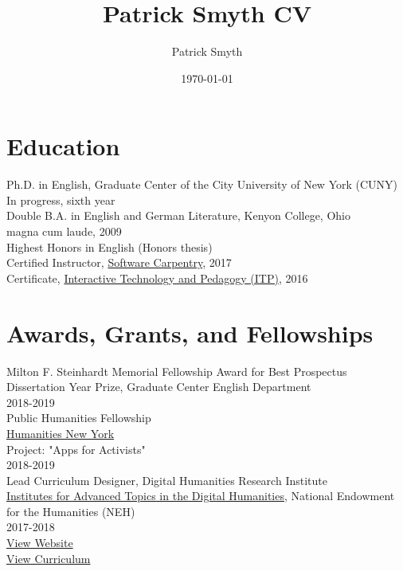 \documentclass[11pt]{article}
\author{Patrick Smyth}
\date{\today}
\title{Patrick Smyth CV}
\begin{document}
\maketitle
\section*{Education}
\label{sec:orgheadline1}
Ph.D. in English, Graduate Center of the City University of New York (CUNY)\\
        In progress, sixth year\\

Double B.A. in English and German Literature, Kenyon College, Ohio\\
        magna cum laude, 2009\\
        Highest Honors in English (Honors thesis)\\

Certified Instructor, \href{https://software-carpentry.org/about/}{Software Carpentry}, 2017\\

Certificate, \href{https://www.gc.cuny.edu/Page-Elements/Academics-Research-Centers-Initiatives/Certificate-Programs/Interactive-Technology-and-Pedagogy}{Interactive Technology and Pedagogy (ITP)}, 2016\\

\section*{Awards, Grants, and Fellowships}
\label{sec:orgheadline2}
Milton F. Steinhardt Memorial Fellowship Award for Best Prospectus\\
Dissertation Year Prize, Graduate Center English Department\\
2018-2019\\

Public Humanities Fellowship\\
\href{https://humanitiesny.org/}{Humanities New York}\\
Project: "Apps for Activists"\\
2018-2019\\

Lead Curriculum Designer, Digital Humanities Research Institute\\
\href{https://www.neh.gov/grants/odh/institutes-advanced-topics-in-the-digital-humanities}{Institutes for Advanced Topics in the Digital Humanities}, National Endowment for the Humanities (NEH)\\
2017-2018\\
\href{http://dhinstitutes.org}{View Website}\\
\href{https://github.com/DHRI-Curriculum}{View Curriculum}\\
\end{document}
